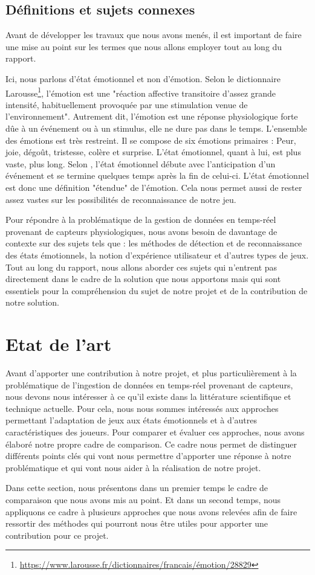 \documentclass[11pt]{article}
\begin{document}
	\subsection{Définitions et sujets connexes}\label{sec:connexe}
		Avant de développer les travaux que nous avons menés, il est important de faire une mise au point sur les termes que nous allons employer tout au long du rapport.\par
		Ici, nous parlons d'état émotionnel et non d'émotion.
		Selon le dictionnaire Larousse\footnote{\href{https://www.larousse.fr/dictionnaires/francais/émotion/28829}{https://www.larousse.fr/dictionnaires/francais/émotion/28829}}, l'émotion est une "réaction affective transitoire d'assez grande intensité, habituellement provoquée par une stimulation venue de l'environnement". 
		Autrement dit, l'émotion est une réponse physiologique forte dûe à un événement ou à un stimulus, elle ne dure pas dans le temps.
		L'ensemble des émotions est très restreint.
		Il se compose de six émotions primaires : Peur, joie, dégoût, tristesse, colère et surprise. 
		L'état émotionnel, quant à lui, est plus vaste, plus long.
		Selon \cite{gal_2019}, l'état émotionnel débute avec l'anticipation d'un événement et se termine quelques temps après la fin de celui-ci.
		L'état émotionnel est donc une définition "étendue" de l'émotion.
		Cela nous permet aussi de rester assez vastes sur les possibilités de reconnaissance de notre jeu.\par
		Pour répondre à la problématique de la gestion de données en temps-réel provenant de capteurs physiologiques, nous avons besoin de davantage de contexte sur des sujets tels que : les méthodes de détection et de reconnaissance des états émotionnels, la notion d'expérience utilisateur et d'autres types de jeux.
		Tout au long du rapport, nous allons aborder ces sujets qui n'entrent pas directement dans le cadre de la solution que nous apportons mais qui sont essentiels pour la compréhension du sujet de notre projet et de la contribution de notre solution.

\section{Etat de l'art}\label{sec:eda}
	Avant d'apporter une contribution à notre projet, et plus particulièrement à la problématique de l'ingestion de données en temps-réel provenant de capteurs, nous devons nous intéresser à ce qu'il existe dans la littérature scientifique et technique actuelle. 
	Pour cela, nous nous sommes intéressés aux approches permettant l'adaptation de jeux aux états émotionnels et à d'autres caractéristiques des joueurs.
	Pour comparer et évaluer ces approches, nous avons élaboré notre propre cadre de comparison.
	Ce cadre nous permet de distinguer différents points clés qui vont nous permettre d'apporter une réponse à notre problématique et qui vont nous aider à la réalisation de notre projet.\par
	Dans cette section, nous présentons dans un premier temps le cadre de comparaison que nous avons mis au point.
	Et dans un second temps, nous appliquons ce cadre à plusieurs approches que nous avons relevées afin de faire ressortir des méthodes qui pourront nous être utiles pour apporter une contribution pour ce projet.
\end{document}

